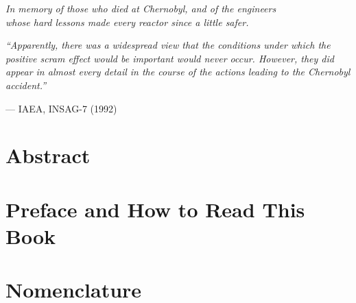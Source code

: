 \documentclass[11pt,oneside]{report}
\theoremstyle{plain}
\theoremstyle{definition}
\theoremstyle{remark}
\begin{document}
\thispagestyle{empty}
\vspace*{4cm}
\begin{center}
{\large\itshape In memory of those who died at Chernobyl, and of the engineers\\
whose hard lessons made every reactor since a little safer.}
\end{center}
\vspace{2cm}
\begin{center}
\begin{minipage}{0.8\linewidth}\itshape\small
``Apparently, there was a widespread view that the conditions under which the
positive scram effect would be important would never occur. However, they did
appear in almost every detail in the course of the actions leading to the
Chernobyl accident.''
\begin{flushright}\normalfont\footnotesize --- IAEA, INSAG-7 (1992)\end{flushright}
\end{minipage}
\end{center}
\clearpage


\chapter*{Abstract}


\chapter*{Preface and How to Read This Book}


\tableofcontents
\listoffigures
\listoftables

\chapter*{Nomenclature}


\clearpage
{}
\end{document}
